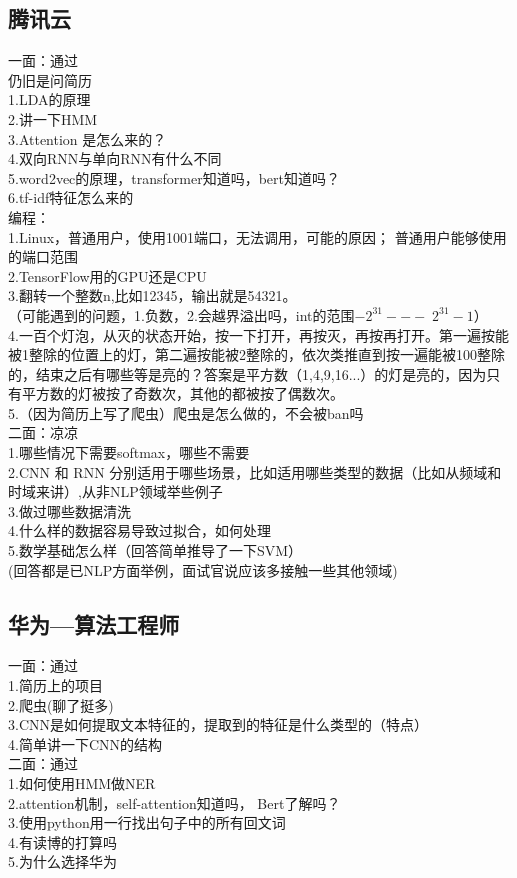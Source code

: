 \documentclass[UTF8]{article}%
\begin{document}
	\subsection{腾讯云}
	一面：通过\\
	仍旧是问简历\\
	1.LDA的原理\\
	2.讲一下HMM\\
	3.Attention 是怎么来的？\\
	4.双向RNN与单向RNN有什么不同\\
	5.word2vec的原理，transformer知道吗，bert知道吗？\\
	6.tf-idf特征怎么来的\\
	编程：\\
	1.Linux，普通用户，使用1001端口，无法调用，可能的原因； 普通用户能够使用的端口范围\\
	2.TensorFlow用的GPU还是CPU\\
	3.翻转一个整数n,比如12345，输出就是54321。\\
	（可能遇到的问题，1.负数，2.会越界溢出吗，int的范围$-2^{31} ---\;2^{31}-1$）\\
	4.一百个灯泡，从灭的状态开始，按一下打开，再按灭，再按再打开。第一遍按能被1整除的位置上的灯，第二遍按能被2整除的，依次类推直到按一遍能被100整除的，结束之后有哪些等是亮的？答案是平方数（1,4,9,16...）的灯是亮的，因为只有平方数的灯被按了奇数次，其他的都被按了偶数次。\\
	5.（因为简历上写了爬虫）爬虫是怎么做的，不会被ban吗\\
	二面：凉凉\\
	1.哪些情况下需要softmax，哪些不需要\\
	2.CNN 和 RNN 分别适用于哪些场景，比如适用哪些类型的数据（比如从频域和时域来讲）,从非NLP领域举些例子\\
	3.做过哪些数据清洗\\
	4.什么样的数据容易导致过拟合，如何处理\\
	5.数学基础怎么样（回答简单推导了一下SVM）\\
	(回答都是已NLP方面举例，面试官说应该多接触一些其他领域)\\
	
	\date{2019年3月27日}
	\subsection{华为---算法工程师}
	一面：通过\\
	1.简历上的项目\\
	2.爬虫(聊了挺多)\\
	3.CNN是如何提取文本特征的，提取到的特征是什么类型的（特点）\\
	4.简单讲一下CNN的结构\\
	二面：通过\\
	1.如何使用HMM做NER\\
	2.attention机制，self-attention知道吗， Bert了解吗？\\
	3.使用python用一行找出句子中的所有回文词\\
	4.有读博的打算吗\\
	5.为什么选择华为\\
	
\end{document}
